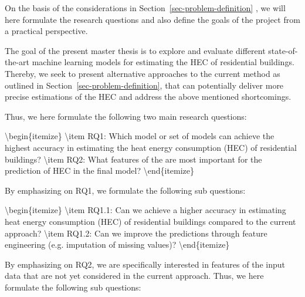 \documentclass[
  letterpaper,
  DIV=11,
  numbers=noendperiod]{scrreprt}
\newenvironment{Shaded}{\begin{snugshade}}{\end{snugshade}}
\newcommand{\ExtensionTok}[1]{\textcolor[rgb]{0.00,0.23,0.31}{#1}}
\newcommand{\FunctionTok}[1]{\textcolor[rgb]{0.28,0.35,0.67}{#1}}
\newcommand{\KeywordTok}[1]{\textcolor[rgb]{0.00,0.23,0.31}{#1}}
\newcommand{\NormalTok}[1]{\textcolor[rgb]{0.00,0.23,0.31}{#1}}
\begin{document}
On the basis of the considerations in
Section~\ref{sec-problem-definition} , we will here formulate the
research questions and also define the goals of the project from a
practical perspective.

The goal of the present master thesis is to explore and evaluate
different state-of-the-art machine learning models for estimating the
HEC of residential buildings. Thereby, we seek to present alternative
approaches to the current method as outlined in
Section~\ref{sec-problem-definition}, that can potentially deliver more
precise estimations of the HEC and address the above mentioned
shortcomings.

Thus, we here formulate the following two main research questions:

\hypertarget{list-research-question}{%
\label{list-research-question}}%
\begin{Shaded}
\begin{Highlighting}[]
\KeywordTok{\textbackslash{}begin}\NormalTok{\{}\ExtensionTok{itemize}\NormalTok{\}}
    \FunctionTok{\textbackslash{}item}\NormalTok{ RQ1: Which model or set of models can achieve the highest accuracy in estimating the heat energy consumption (HEC) of residential buildings?}
    \FunctionTok{\textbackslash{}item}\NormalTok{ RQ2: What features of the are most important for the prediction of HEC in the final model?}
\KeywordTok{\textbackslash{}end}\NormalTok{\{}\ExtensionTok{itemize}\NormalTok{\}}
\end{Highlighting}
\end{Shaded}

By emphasizing on RQ1, we formulate the following sub questions:

\begin{Shaded}
\begin{Highlighting}[]
\KeywordTok{\textbackslash{}begin}\NormalTok{\{}\ExtensionTok{itemize}\NormalTok{\}}
    \FunctionTok{\textbackslash{}item}\NormalTok{ RQ1.1: Can we achieve a higher accuracy in estimating heat energy consumption (HEC) of residential buildings compared to the current approach?}
    \FunctionTok{\textbackslash{}item}\NormalTok{ RQ1.2: Can we improve the predictions through feature engineering (e.g. imputation of missing values)?}
\KeywordTok{\textbackslash{}end}\NormalTok{\{}\ExtensionTok{itemize}\NormalTok{\}}
\end{Highlighting}
\end{Shaded}

By emphasizing on RQ2, we are specifically interested in features of the
input data that are not yet considered in the current approach. Thus, we
here formulate the following sub questions:
\end{document}
